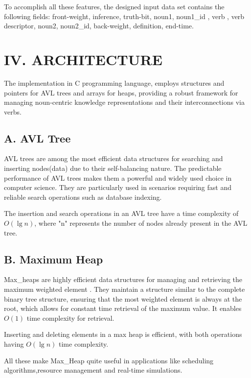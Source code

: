 \documentclass[conference]{IEEEtran}
\begin{document}
To accomplish all these features, the designed input data set contains the following fields: front-weight, inference, truth-bit, noun1, noun1\_id , verb , verb descriptor, noun2, noun2\_id, back-weight, definition, end-time.




\section*{IV. ARCHITECTURE}

The implementation in C programming language\cite{b9}, employs structures and pointers for AVL trees and arrays for heaps, providing a robust framework for managing noun-centric knowledge representations and their interconnections via verbs.

\subsection*{A. AVL Tree}

AVL trees\cite{b14} are among the most efficient data structures for searching and inserting nodes(data) due to their 
self-balancing nature. The predictable performance of AVL trees makes 
them a powerful and widely used choice in computer 
science.
They are particularly used in scenarios requiring fast and reliable search operations such as database indexing.

The insertion and search operations in an AVL tree have a time complexity of $O(\lg n)$, 
where "n" represents the number of nodes already present in the AVL tree.


\subsection*{B. Maximum Heap}

Max\_heaps\cite{b14} are highly efficient data structures for managing and retrieving the maximum weighted element . 
They maintain a structure similar to the complete binary tree structure, ensuring that the most weighted 
element is always at the root, which allows for constant time retrieval of the maximum value.
It enables $O(1)$ time complexity for retrieval.

Inserting and deleting elements in a max heap is efficient, with both operations having $O(\lg n)$ 
   time complexity.

All these make Max\_Heap quite useful in applications like scheduling algorithms,resource management 
and real-time simulations.
\end{document}
